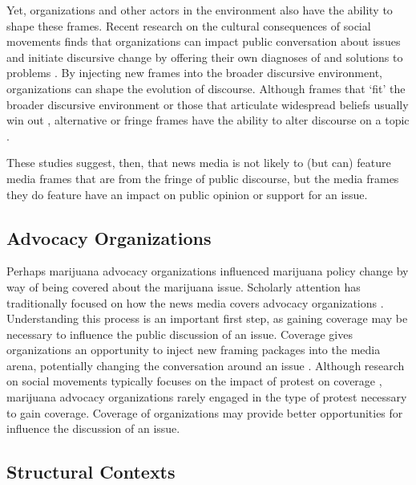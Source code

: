 Yet, organizations and other actors in the environment also have the ability to shape these frames. Recent research on the cultural consequences of social movements \citep{earl_2004} finds that organizations can impact public conversation about issues \citep{bail_et_al_2017} and initiate discursive change by offering their own diagnoses of and solutions to problems \citep{bail_2012,snow_et_al_2007,benford_and_snow_2000}. By injecting new frames into the broader discursive environment, organizations can shape the evolution of discourse. Although frames that `fit' the broader discursive environment \citep{mccammon_et_al_2007} or those that articulate widespread beliefs usually win out \citep{mccammon_et_al_2001,snow_et_al_2007,gamson_and_modigliani_1989}, alternative or fringe frames have the ability to alter discourse on a topic \citep{bail_2012}.

These studies suggest, then, that news media is not likely to (but can) feature media frames that are from the fringe of public discourse, but the media frames they do feature have an impact on public opinion or support for an issue. 

\subsection{Advocacy Organizations}

Perhaps marijuana advocacy organizations influenced marijuana policy change by way of being covered about the marijuana issue. Scholarly attention has traditionally focused on how the news media covers advocacy organizations \citep{amenta_et_al_2009,andrews_and_caren_2010}. Understanding this process is an important first step, as gaining coverage may be necessary to influence the public discussion of an issue. Coverage gives organizations an opportunity to inject new framing packages into the media arena, potentially changing the conversation around an issue \citep{gamson_and_modigliani_1989}. Although research on social movements typically focuses on the impact of protest on coverage \citep{earl_et_al_2004,oliver_and_myers_1999}, marijuana advocacy organizations rarely engaged in the type of protest necessary to gain coverage. Coverage of organizations may provide better opportunities for influence the discussion of an issue. 


\subsection{Structural Contexts}

